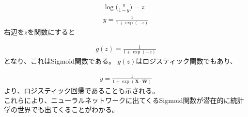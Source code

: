 \begin{eqnarray}
\log \bigl(\frac{y}{1-y}\bigr) = z \\
y = \frac{1}{1 + \exp(-z)}
\end{eqnarray}
右辺を$ z $を関数にすると

\begin{eqnarray}
g(z) = \frac{1}{1 + \exp(-z)}
\end{eqnarray}
となり、これはSigmoid関数である。
$ g(z) $はロジスティック関数でもあり、


\begin{eqnarray}
y = \frac{1}{1 + \exp (\mathbf{X} \cdot  \mathbf{W})}
\end{eqnarray}
より、ロジスティック回帰であることも示される。 \\

これらにより、ニューラルネットワークに出てくるSigmoid関数が潜在的に統計学の世界でも出てくることがわかる。






